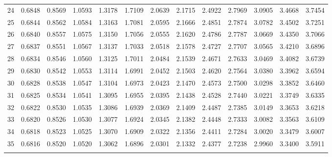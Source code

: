 {\begin{tabular}{l|llllllllllll}
 24 & 0.6848 & 0.8569 & 1.0593 & 1.3178 & 1.7109 & 2.0639 & 2.1715 & 2.4922 & 2.7969 & 3.0905 & 3.4668 & 3.7454 \\[12pt] \arrayrulecolor{light-gray}\hline\arrayrulecolor{black}  
 25 & 0.6844 & 0.8562 & 1.0584 & 1.3163 & 1.7081 & 2.0595 & 2.1666 & 2.4851 & 2.7874 & 3.0782 & 3.4502 & 3.7251 \\[5pt] \arrayrulecolor{light-gray}\hline\arrayrulecolor{black}  
 26 & 0.6840 & 0.8557 & 1.0575 & 1.3150 & 1.7056 & 2.0555 & 2.1620 & 2.4786 & 2.7787 & 3.0669 & 3.4350 & 3.7066 \\[5pt] \arrayrulecolor{light-gray}\hline\arrayrulecolor{black}  
 27 & 0.6837 & 0.8551 & 1.0567 & 1.3137 & 1.7033 & 2.0518 & 2.1578 & 2.4727 & 2.7707 & 3.0565 & 3.4210 & 3.6896 \\[5pt] \arrayrulecolor{light-gray}\hline\arrayrulecolor{black}  
 28 & 0.6834 & 0.8546 & 1.0560 & 1.3125 & 1.7011 & 2.0484 & 2.1539 & 2.4671 & 2.7633 & 3.0469 & 3.4082 & 3.6739 \\[5pt] \arrayrulecolor{light-gray}\hline\arrayrulecolor{black}  
 29 & 0.6830 & 0.8542 & 1.0553 & 1.3114 & 1.6991 & 2.0452 & 2.1503 & 2.4620 & 2.7564 & 3.0380 & 3.3962 & 3.6594 \\[12pt] \arrayrulecolor{light-gray}\hline\arrayrulecolor{black}  
 30 & 0.6828 & 0.8538 & 1.0547 & 1.3104 & 1.6973 & 2.0423 & 2.1470 & 2.4573 & 2.7500 & 3.0298 & 3.3852 & 3.6460 \\[5pt] \arrayrulecolor{light-gray}\hline\arrayrulecolor{black}  
 31 & 0.6825 & 0.8534 & 1.0541 & 1.3095 & 1.6955 & 2.0395 & 2.1438 & 2.4528 & 2.7440 & 3.0221 & 3.3749 & 3.6335 \\[5pt] \arrayrulecolor{light-gray}\hline\arrayrulecolor{black}  
 32 & 0.6822 & 0.8530 & 1.0535 & 1.3086 & 1.6939 & 2.0369 & 2.1409 & 2.4487 & 2.7385 & 3.0149 & 3.3653 & 3.6218 \\[5pt] \arrayrulecolor{light-gray}\hline\arrayrulecolor{black}  
 33 & 0.6820 & 0.8526 & 1.0530 & 1.3077 & 1.6924 & 2.0345 & 2.1382 & 2.4448 & 2.7333 & 3.0082 & 3.3563 & 3.6109 \\[5pt] \arrayrulecolor{light-gray}\hline\arrayrulecolor{black}  
 34 & 0.6818 & 0.8523 & 1.0525 & 1.3070 & 1.6909 & 2.0322 & 2.1356 & 2.4411 & 2.7284 & 3.0020 & 3.3479 & 3.6007 \\[12pt] \arrayrulecolor{light-gray}\hline\arrayrulecolor{black}  
 35 & 0.6816 & 0.8520 & 1.0520 & 1.3062 & 1.6896 & 2.0301 & 2.1332 & 2.4377 & 2.7238 & 2.9960 & 3.3400 & 3.5911 \\[5pt] \arrayrulecolor{light-gray}\hline\arrayrulecolor{black}  

\end{tabular}}

